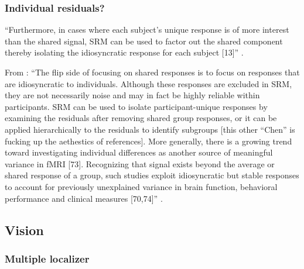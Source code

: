 \subsubsection{Individual residuals?}


%
``Furthermore, in cases where each subject's unique response is of more interest
than the shared signal, SRM can be used to factor out the shared component
thereby isolating the idiosyncratic response for each subject [13]''
\citep{kumar2020brainiak}.

From \citep{cohen2017computational}: ``The flip side of focusing on shared
responses is to focus on responses that are idiosyncratic to individuals.
Although these responses are excluded in SRM, they are not necessarily noise and
may in fact be highly reliable within participants.  SRM can be used to isolate
participant-unique responses by examining the residuals after removing shared
group responses, or it can be applied hierarchically to the residuals to
identify subgroups \citep{chen2017shared} \citep{cohen2017computational} [this
other ``Chen'' is fucking up the aethestics of references].  More generally,
there is a growing trend toward investigating individual differences as another
source of meaningful variance in fMRI [73].  Recognizing that signal exists
beyond the average or shared response of a group, such studies exploit
idiosyncratic but stable responses to account for previously unexplained
variance in brain function, behavioral performance and clinical measures
[70,74]'' \citep{cohen2017computational}.



\subsection{Vision}




\subsubsection{Multiple localizer}

